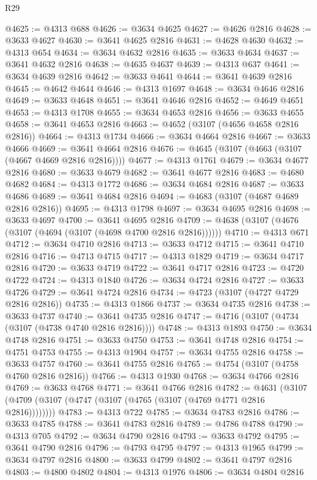 \begin{lexlean}{R29}
\begin{coremodule}
@4625 := @4313 @688
@4626 := @3634 @4625
@4627 := @4626 @2816
@4628 := @3633 @4627
@4630 := @3641 @4625 @2816
@4631 := @4628 @4630
@4632 := @4313 @654
@4634 := @3634 @4632 @2816
@4635 := @3633 @4634
@4637 := @3641 @4632 @2816
@4638 := @4635 @4637
@4639 := @4313 @637
@4641 := @3634 @4639 @2816
@4642 := @3633 @4641
@4644 := @3641 @4639 @2816
@4645 := @4642 @4644
@4646 := @4313 @1697
@4648 := @3634 @4646 @2816
@4649 := @3633 @4648
@4651 := @3641 @4646 @2816
@4652 := @4649 @4651
@4653 := @4313 @1708
@4655 := @3634 @4653 @2816
@4656 := @3633 @4655
@4658 := @3641 @4653 @2816
@4663 := @4652 (@3107 (@4656 @4658 @2816 @2816))
@4664 := @4313 @1734
@4666 := @3634 @4664 @2816
@4667 := @3633 @4666
@4669 := @3641 @4664 @2816
@4676 := @4645 (@3107 (@4663 (@3107 (@4667 @4669 @2816 @2816))))
@4677 := @4313 @1761
@4679 := @3634 @4677 @2816
@4680 := @3633 @4679
@4682 := @3641 @4677 @2816
@4683 := @4680 @4682
@4684 := @4313 @1772
@4686 := @3634 @4684 @2816
@4687 := @3633 @4686
@4689 := @3641 @4684 @2816
@4694 := @4683 (@3107 (@4687 @4689 @2816 @2816))
@4695 := @4313 @1798
@4697 := @3634 @4695 @2816
@4698 := @3633 @4697
@4700 := @3641 @4695 @2816
@4709 := @4638 (@3107 (@4676 (@3107 (@4694 (@3107 (@4698 @4700 @2816 @2816))))))
@4710 := @4313 @671
@4712 := @3634 @4710 @2816
@4713 := @3633 @4712
@4715 := @3641 @4710 @2816
@4716 := @4713 @4715
@4717 := @4313 @1829
@4719 := @3634 @4717 @2816
@4720 := @3633 @4719
@4722 := @3641 @4717 @2816
@4723 := @4720 @4722
@4724 := @4313 @1840
@4726 := @3634 @4724 @2816
@4727 := @3633 @4726
@4729 := @3641 @4724 @2816
@4734 := @4723 (@3107 (@4727 @4729 @2816 @2816))
@4735 := @4313 @1866
@4737 := @3634 @4735 @2816
@4738 := @3633 @4737
@4740 := @3641 @4735 @2816
@4747 := @4716 (@3107 (@4734 (@3107 (@4738 @4740 @2816 @2816))))
@4748 := @4313 @1893
@4750 := @3634 @4748 @2816
@4751 := @3633 @4750
@4753 := @3641 @4748 @2816
@4754 := @4751 @4753
@4755 := @4313 @1904
@4757 := @3634 @4755 @2816
@4758 := @3633 @4757
@4760 := @3641 @4755 @2816
@4765 := @4754 (@3107 (@4758 @4760 @2816 @2816))
@4766 := @4313 @1930
@4768 := @3634 @4766 @2816
@4769 := @3633 @4768
@4771 := @3641 @4766 @2816
@4782 := @4631 (@3107 (@4709 (@3107 (@4747 (@3107 (@4765 (@3107 (@4769 @4771 @2816 @2816))))))))
@4783 := @4313 @722
@4785 := @3634 @4783 @2816
@4786 := @3633 @4785
@4788 := @3641 @4783 @2816
@4789 := @4786 @4788
@4790 := @4313 @705
@4792 := @3634 @4790 @2816
@4793 := @3633 @4792
@4795 := @3641 @4790 @2816
@4796 := @4793 @4795
@4797 := @4313 @1965
@4799 := @3634 @4797 @2816
@4800 := @3633 @4799
@4802 := @3641 @4797 @2816
@4803 := @4800 @4802
@4804 := @4313 @1976
@4806 := @3634 @4804 @2816

\end{coremodule}
\end{lexlean}

